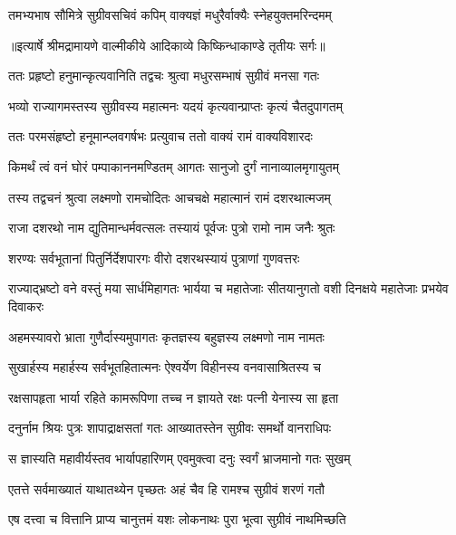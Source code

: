 \twolineshloka
{तमभ्यभाष सौमित्रे सुग्रीवसचिवं कपिम्}
{वाक्यज्ञं मधुरैर्वाक्यैः स्नेहयुक्तमरिन्दमम्} %


{॥इत्यार्षे श्रीमद्रामायणे वाल्मीकीये आदिकाव्ये किष्किन्धाकाण्डे तृतीयः सर्गः॥}


\twolineshloka
{ततः प्रहृष्टो हनुमान्कृत्यवानिति तद्वचः}
{श्रुत्वा मधुरसम्भाषं सुग्रीवं मनसा गतः} %

\twolineshloka
{भव्यो राज्यागमस्तस्य सुग्रीवस्य महात्मनः}
{यदयं कृत्यवान्प्राप्तः कृत्यं चैतदुपागतम्} %

\twolineshloka
{ततः परमसंहृष्टो हनूमान्प्लवगर्षभः}
{प्रत्युवाच ततो वाक्यं रामं वाक्यविशारदः} %

\twolineshloka
{किमर्थं त्वं वनं घोरं पम्पाकाननमण्डितम्}
{आगतः सानुजो दुर्गं नानाव्यालमृगायुतम्} %

\twolineshloka
{तस्य तद्वचनं श्रुत्वा लक्ष्मणो रामचोदितः}
{आचचक्षे महात्मानं रामं दशरथात्मजम्} %

\twolineshloka
{राजा दशरथो नाम द्युतिमान्धर्मवत्सलः}
{तस्यायं पूर्वजः पुत्रो रामो नाम जनैः श्रुतः} %

\twolineshloka
{शरण्यः सर्वभूतानां पितुर्निर्देशपारगः}
{वीरो दशरथस्यायं पुत्राणां गुणवत्तरः} %

\threelineshloka
{राज्याद्भ्रष्टो वने वस्तुं मया सार्धमिहागतः}
{भार्यया च महातेजाः सीतयानुगतो वशी}
{दिनक्षये महातेजाः प्रभयेव दिवाकरः} %

\twolineshloka
{अहमस्यावरो भ्राता गुणैर्दास्यमुपागतः}
{कृतज्ञस्य बहुज्ञस्य लक्ष्मणो नाम नामतः} %

\twolineshloka
{सुखार्हस्य महार्हस्य सर्वभूतहितात्मनः}
{ऐश्वर्येण विहीनस्य वनवासाश्रितस्य च} %

\twolineshloka
{रक्षसापहृता भार्या रहिते कामरूपिणा}
{तच्च न ज्ञायते रक्षः पत्नी येनास्य सा हृता} %

\twolineshloka
{दनुर्नाम श्रियः पुत्रः शापाद्राक्षसतां गतः}
{आख्यातस्तेन सुग्रीवः समर्थो वानराधिपः} %

\twolineshloka
{स ज्ञास्यति महावीर्यस्तव भार्यापहारिणम्}
{एवमुक्त्वा दनुः स्वर्गं भ्राजमानो गतः सुखम्} %

\twolineshloka
{एतत्ते सर्वमाख्यातं याथातथ्येन पृच्छतः}
{अहं चैव हि रामश्च सुग्रीवं शरणं गतौ} %

\twolineshloka
{एष दत्त्वा च वित्तानि प्राप्य चानुत्तमं यशः}
{लोकनाथः पुरा भूत्वा सुग्रीवं नाथमिच्छति} %

